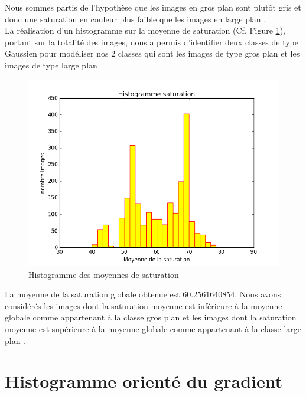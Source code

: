 \documentclass{book}
\begin{document}
Nous sommes partis de l’hypothèse que les images en \og gros plan \fg{} sont plutôt gris et donc une saturation en couleur plus faible que les images en \og large plan \fg{}.\\
La réalisation d’un histogramme sur la moyenne de saturation (Cf. Figure \ref{hue_histo}), portant sur la totalité des images, nous a permis d’identifier deux classes de type Gaussien pour modéliser nos 2 classes
qui sont les images de type \og gros plan \fg{} et les images de type \og large plan \fg{}\\
\label{hue_frontiere}
\begin{figure}[H]
\begin{center}
\includegraphics[scale=0.5]{hue_histogramme.jpg}
\end{center}
\caption{Histogramme des moyennes de saturation}
\label{hue_histo}
\end{figure}

La moyenne de la saturation globale obtenue est 60.2561640854. 
Nous avons considérés les images dont la saturation moyenne est inférieure à la moyenne globale comme appartenant à la classe \og gros plan \fg{} et les images dont 
la saturation moyenne est supérieure à la moyenne globale comme appartenant à la classe \og large plan \fg{}.

\section{Histogramme orienté du gradient}
\end{document}
